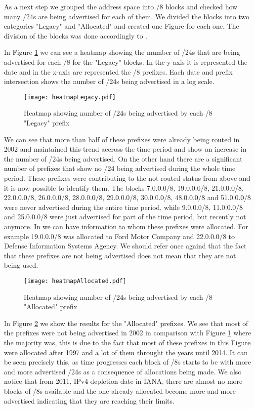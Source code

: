 \documentclass[11pt,a4paper]{scrreprt}
\begin{document}
As a next step we grouped the address space into /8 blocks and checked how many /24s are being advertised for each of them. We divided the blocks into two categories "Legacy" and "Allocated" and created one Figure for each one. The division of the blocks was done accordingly to \cite{IANA_Address_Space}.

In Figure \ref{fig:heatmapLegacy} we can see a heatmap showing the mumber of /24s that are being advertised for each /8 for the "Legacy" blocks. In the y-axis it is represented the date and in the x-axis are represented the /8 prefixes.  Each date and prefix intersection shows the number of /24s being advertised in a log scale. 

\begin{figure}[!h]
\centering
\texttt{[image: heatmapLegacy.pdf]}
\caption{Heatmap showing number of /24s being advertised by each /8 "Legacy" prefix}
\label{fig:heatmapLegacy}
\end{figure}

We can see that more than half of these prefixes were already being routed in 2002 and maintained this trend accross the time period and show an increase in the number of /24s being advertised. On the other hand there are a significant number of prefixes that show no /24 being advertised during the whole time period. These prefixes were contributing to the not routed status from above and it is now possible to identify them. The blocks 7.0.0.0/8, 19.0.0.0/8, 21.0.0.0/8, 22.0.0.0/8, 26.0.0.0/8, 28.0.0.0/8, 29.0.0.0/8, 30.0.0.0/8, 48.0.0.0/8 and 51.0.0.0/8 were never advertised during the entire time period, while 9.0.0.0/8, 11.0.0.0/8 and 25.0.0.0/8 were just advertised for part of the time period, but recently not anymore. In \cite{IANA_Address_Space} we can have information to whom these prefixes were allocated. For example 19.0.0.0/8 was allocated to Ford Motor Company and 22.0.0.0/8 to Defense Information Systems Agency. We should refer once againd that the fact that these prefixes are not being advertised does not mean that they are not being used.  

\begin{figure}[!h]
\centering
\texttt{[image: heatmapAllocated.pdf]}
\caption{Heatmap showing number of /24s being advertised by each /8 "Allocated" prefix}
\label{fig:heatmapAllocated}
\end{figure}

In Figure \ref{fig:heatmapAllocated} we show the results for the "Allocated" prefixes. We see that most of the prefixes were not being advertised in 2002 in comparison with Figure \ref{fig:heatmapLegacy} where the majority was, this is due to the fact that most of these prefixes in this Figure were allocated after 1997 and a lot of them throught the years until 2014. It can be seen precisely this, as time progresses each block of /8s starts to be with more and more advertised /24s as a consequence of allocations being made. We also notice that from 2011, IPv4 depletion date in IANA, there are almost no more blocks of /8s available and the one already allocated become more and more advertised indicating that they are reaching their limits. 
\end{document}
